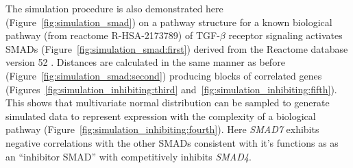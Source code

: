 \documentclass[article, shortnames]{jss}
\begin{document}
The simulation procedure is also demonstrated here (Figure~\ref{fig:simulation_smad}) on a pathway structure for a known biological pathway (from reactome R-HSA-2173789) of TGF-$\beta$ receptor signaling activates SMADs (Figure~\ref{fig:simulation_smad:first}) derived from the Reactome database version 52 \citep{Reactome}. Distances are calculated in the same manner as before (Figure~\ref{fig:simulation_smad:second}) producing blocks of correlated genes (Figures~\ref{fig:simulation_inhibiting:third} and~\ref{fig:simulation_inhibiting:fifth}). This shows that multivariate normal distribution can be sampled to generate simulated data to represent expression with the complexity of a biological pathway (Figure~\ref{fig:simulation_inhibiting:fourth}). Here \textit{SMAD7} exhibits negative correlations with the other SMADs consistent with it's functions as as an ``inhibitor SMAD'' with competitively inhibits \textit{SMAD4}. %

\iffalse
These simulated datasets could then be used for simulating synthetic lethal partners of a query gene within a graph network. The query gene was assumed to be separate from the graph network pathway and was added to the dataset using the procedure in Section~\ref{methods:simulating_SL}. Thus I can simulate known synthetic lethal partner genes within a synthetic lethal partner pathway structure.
\fi

\iffalse

	\texttt{[image: \{dist\_mat.png]}}
	\texttt{[image: \{sigma\_mat.png]}}
		\texttt{[image: \{expr\_mat.png]}}
			\texttt{[image: \{expr\_cor\_mat.png]}}
		\texttt{[image: \{expr\_disc\_mat.png]}}
		
	\texttt{[image: \{state\_matrix\_inhibiting.png]}}
	\texttt{[image: \{dist\_mat.png]}}
		\texttt{[image: \{sigma\_mat\_inhibiting.png]}}
		\texttt{[image: \{expr\_inhib\_mat.png]}}
			\texttt{[image: \{expr\_inhib\_cor\_mat.png]}}
		\texttt{[image: \{expr\_inhib\_disc\_mat.png]}}
	
\fi	




\end{document}
